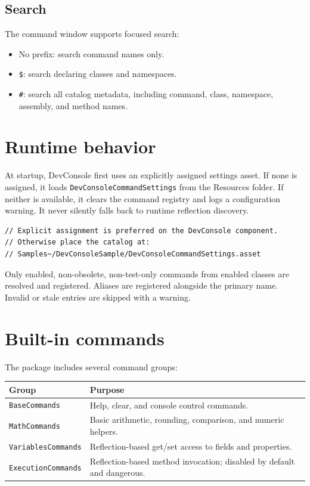 \documentclass[11pt,a4paper]{article}
\begin{document}
\subsection{Search}

The command window supports focused search:

\begin{itemize}[leftmargin=*]
  \item No prefix: search command names only.
  \item \texttt{\$}: search declaring classes and namespaces.
  \item \texttt{\#}: search all catalog metadata, including command, class, namespace, assembly, and method names.
\end{itemize}

\section{Runtime behavior}

At startup, DevConsole first uses an explicitly assigned settings asset. If none is assigned, it loads \texttt{DevConsoleCommandSettings} from the Resources folder. If neither is available, it clears the command registry and logs a configuration warning. It never silently falls back to runtime reflection discovery.

\begin{lstlisting}[style=csharp]
// Explicit assignment is preferred on the DevConsole component.
// Otherwise place the catalog at:
// Samples~/DevConsoleSample/DevConsoleCommandSettings.asset
\end{lstlisting}

Only enabled, non-obsolete, non-test-only commands from enabled classes are resolved and registered. Aliases are registered alongside the primary name. Invalid or stale entries are skipped with a warning.

\section{Built-in commands}

The package includes several command groups:

\begin{longtable}{p{}p{}}
\toprule
\textbf{Group} & \textbf{Purpose} \\
\midrule
\texttt{BaseCommands} & Help, clear, and console control commands. \\
\texttt{MathCommands} & Basic arithmetic, rounding, comparison, and numeric helpers. \\
\texttt{VariablesCommands} & Reflection-based get/set access to fields and properties. \\
\texttt{ExecutionCommands} & Reflection-based method invocation; disabled by default and dangerous. \\
\bottomrule
\end{longtable}
\end{document}
